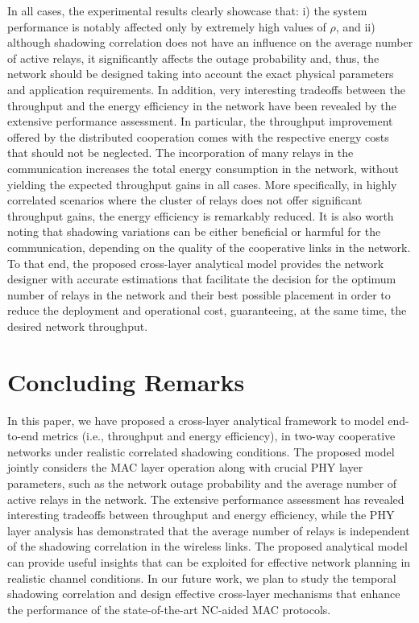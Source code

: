 \documentclass[12pt,draftcls, onecolumn]{IEEEtran}
\begin{document}
In all cases, the experimental results clearly showcase that: i) the system performance is notably affected only by extremely high values of $\rho$, and ii) although shadowing correlation does not have an influence on the average number of active relays, it significantly affects the outage probability and, thus, the network should be designed taking into account the exact physical parameters and application requirements. In addition, very interesting tradeoffs between the throughput and the energy efficiency in the network have been revealed by the extensive performance assessment. In particular, the throughput improvement offered by the distributed cooperation comes with the respective energy costs that should not be neglected. The incorporation of many relays in the communication increases the total energy consumption in the network, without yielding the expected throughput gains in all cases. More specifically, in highly correlated scenarios where the cluster of relays does not offer significant throughput gains, the energy efficiency is remarkably reduced. It is also worth noting that shadowing variations can be either beneficial or harmful for the communication, depending on the quality of the cooperative links in the network. To that end, the proposed cross-layer analytical model provides the network designer with accurate estimations that facilitate the decision for the optimum number of relays in the network and their best possible placement in order to reduce the deployment and operational cost, guaranteeing, at the same time, the desired network throughput.


\section{Concluding Remarks}
\label{sec:conclusions}

In this paper, we have proposed a cross-layer analytical framework to model end-to-end metrics (i.e., throughput and energy efficiency), in two-way cooperative networks under realistic correlated shadowing conditions. The proposed model jointly considers the MAC layer operation along with crucial PHY layer parameters, such as the network outage probability and the average number of active relays in the network. The extensive performance assessment has revealed interesting tradeoffs between throughput and energy efficiency, while the PHY layer analysis has demonstrated that the average number of relays is independent of the shadowing correlation in the wireless links. The proposed analytical model can provide useful insights that can be exploited for effective network planning in realistic channel conditions. In our future work, we plan to study the temporal shadowing correlation and design effective cross-layer mechanisms that enhance the performance of the state-of-the-art NC-aided MAC protocols.
\end{document}
